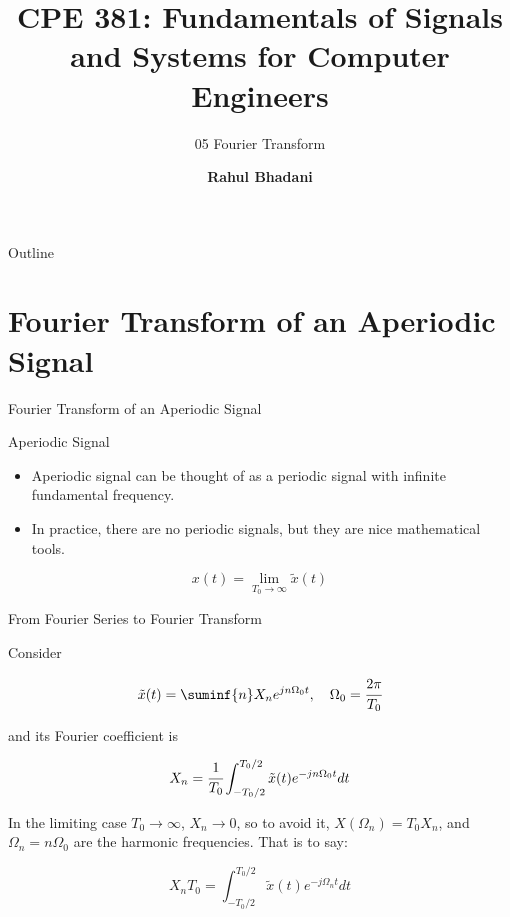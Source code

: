 \documentclass[aspectratio=169,xcolor=dvipsnames,svgnames,x11names,fleqn]{beamer}
\title[CPE 381: Signals and Systems]{CPE 381: Fundamentals of Signals and Systems for Computer Engineers} %
\subtitle{05 Fourier Transform}
\author[Rahul Bhadani] {{\Large \textbf{Rahul Bhadani}}}
\institute[UAH] %
{
    Electrical \& Computer Engineering,  The University of Alabama in Huntsville
}
\date
\begin{document}
\begin{frame}
\titlepage
\end{frame}

\begin{frame}{Outline}
    \tableofcontents
\end{frame}

\section{Fourier Transform of an Aperiodic Signal}


\begin{frame}{}
    \begin{center}
    \Huge \bf \color{DarkBlue}
    \faStar
    
Fourier Transform of an Aperiodic Signal

\end{center}
\end{frame}


\begin{frame}{Aperiodic Signal}

    \begin{itemize}
        \item Aperiodic signal can be thought of as a periodic signal with infinite fundamental frequency.
\item In practice, there are no periodic signals, but they are nice mathematical tools.

    \end{itemize}

    $$
    x(t)  = \lim_{T_0 \to \infty } \tilde{x} (t)
    $$
    
\end{frame}


\begin{frame}{From Fourier Series to Fourier Transform}

Consider

$$
\tilde{x} (t) = \suminf{n} X_n e^{jn\Omega_0 t}, \quad \Omega_0 = \cfrac{2\pi}{T_0}
$$

and its Fourier coefficient is 

    $$
    X_n  = \cfrac{1}{T_0} \int_{-T_0/2}^{T_0/2} \tilde{x} (t)e^{-jn\Omega_0 t}dt
    $$

In the limiting case $T_0 \to \infty $, $X_n \to 0$, so to avoid it, $X(\Omega_n) = T_0 X_n$, and $\Omega_n = n\Omega_0$ are the harmonic frequencies. That is to say:

\begin{tblock}{}
$$
    X_nT_0  = \int_{-T_0/2}^{T_0/2} \tilde{x} (t)e^{-j\Omega_n t}dt
$$
\end{tblock}
\end{frame}
\end{document}
